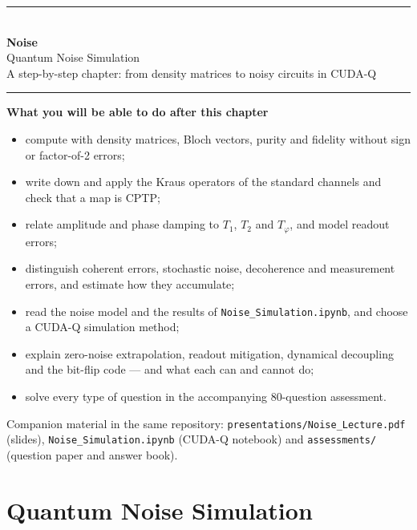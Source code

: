 \documentclass[11pt,a4paper,openany]{book}
\begin{document}
\begin{titlepage}
\centering
{\color{brand}\rule{\linewidth}{1.5pt}}\\[10pt]
{\Huge\bfseries\color{brand} Noise}\\[8pt]
{\LARGE Quantum Noise Simulation}\\[6pt]
{\large A step-by-step chapter: from density matrices to noisy circuits in CUDA-Q}\\[6pt]
{\color{brand}\rule{\linewidth}{1.5pt}}
\vspace{18mm}

\begin{minipage}{0.86\linewidth}
\large
\textbf{What you will be able to do after this chapter}
\begin{itemize}[itemsep=3pt]
\item compute with density matrices, Bloch vectors, purity and fidelity without sign or factor-of-2 errors;
\item write down and apply the Kraus operators of the standard channels and check that a map is CPTP;
\item relate amplitude and phase damping to $T_1$, $T_2$ and $T_\varphi$, and model readout errors;
\item distinguish coherent errors, stochastic noise, decoherence and measurement errors, and estimate how they accumulate;
\item read the noise model and the results of \texttt{Noise\_Simulation.ipynb}, and choose a CUDA-Q simulation method;
\item explain zero-noise extrapolation, readout mitigation, dynamical decoupling and the bit-flip code --- and what each can and cannot do;
\item solve every type of question in the accompanying 80-question assessment.
\end{itemize}
\end{minipage}
\vfill
{\small Companion material in the same repository: \texttt{presentations/Noise\_Lecture.pdf} (slides),
\texttt{Noise\_Simulation.ipynb} (CUDA-Q notebook) and \texttt{assessments/} (question paper and answer book).}
\end{titlepage}

\tableofcontents
\setcounter{chapter}{0}
\chapter*{Quantum Noise Simulation}
\end{document}
